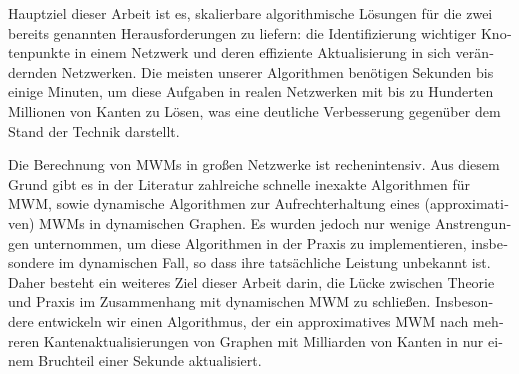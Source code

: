 \begin{otherlanguage}{ngerman}
Hauptziel dieser Arbeit ist es, skalierbare algorithmische
Lösungen für die zwei bereits genannten Herausforderungen zu liefern: die
Identifizierung wichtiger Knotenpunkte in einem Netzwerk und deren
effiziente Aktualisierung in sich verändernden Netzwerken.
Die meisten unserer Algorithmen benötigen Sekunden bis einige
Minuten, um diese Aufgaben in realen Netzwerken mit bis zu Hunderten Millionen
von Kanten zu Lösen, was eine deutliche Verbesserung gegenüber dem Stand der Technik
darstellt.

Die Berechnung von MWMs in großen Netzwerke ist rechenintensiv.
Aus diesem Grund gibt es in der Literatur zahlreiche
schnelle inexakte Algorithmen für MWM, sowie dynamische Algorithmen zur
Aufrechterhaltung eines (approximativen) MWMs in dynamischen Graphen. Es wurden
jedoch nur wenige Anstrengungen unternommen, um diese Algorithmen in der Praxis
zu implementieren, insbesondere im dynamischen Fall, so dass ihre tatsächliche
Leistung unbekannt ist. Daher besteht ein weiteres Ziel dieser Arbeit darin,
die Lücke zwischen Theorie und Praxis im Zusammenhang mit dynamischen MWM zu
schließen. Insbesondere entwickeln wir einen Algorithmus, der ein
approximatives MWM nach mehreren Kantenaktualisierungen von Graphen mit
Milliarden von Kanten in nur einem Bruchteil einer Sekunde aktualisiert.
\end{otherlanguage}
